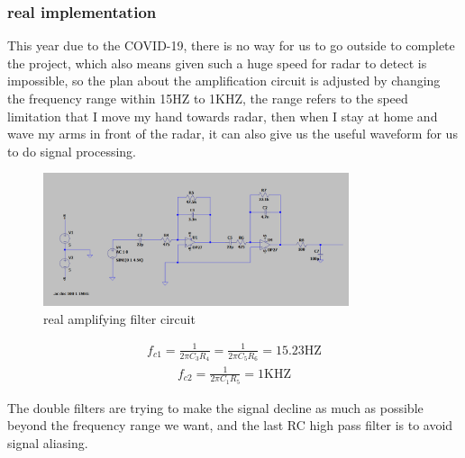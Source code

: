 \subsubsection{real implementation}
This year due to the COVID-19, there is no way for us to go outside to complete the project, which also means given such a huge speed for radar to detect is impossible,  so the plan about the amplification circuit is adjusted by changing the frequency range within 15HZ to 1KHZ, the range refers to the speed limitation that I move my hand towards radar, then when I stay at home and wave my arms in front of the radar, it can also give us the useful waveform for us to do signal processing.
\begin{figure}[H]
    \centering
    \includegraphics[width=0.8\textwidth]{figure/realamplifyingfiltercircuit.png}
    \caption{real amplifying filter circuit}
\end{figure}
\begin{align}
f_{c 1}=\frac{1}{2 \pi C_{3} R_{4}}=\frac{1}{2 \pi C_{5} R_{6}}=15.23 \mathrm{HZ}
\end{align}
\begin{align}
f_{c 2}=\frac{1}{2 \pi C_{1} R_{5}}=1 \mathrm{KHZ}
\end{align}

The double filters are trying to make the signal decline as much as possible beyond the frequency range we want, and the last RC high pass filter is to avoid signal aliasing. 

